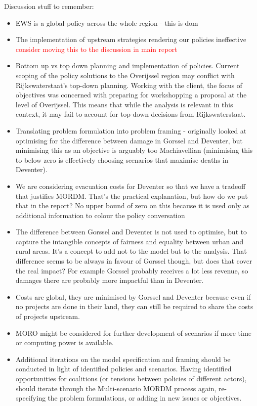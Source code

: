Discussion stuff to remember:
\begin{itemize}
    \item EWS is a global policy across the whole region - this is dom
    \item The implementation of upstream strategies rendering our policies ineffective \textcolor{red}{consider moving this to the discussion in main report}
    \item Bottom up vs top down planning and implementation of policies. Current scoping of the policy solutions to the Overijssel region may conflict with Rijkswaterstaat's top-down planning. Working with the client, the focus of objectives was concerned with preparing for workshopping a proposal at the level of Overijssel. This means that while the analysis is relevant in this context, it may fail to account for top-down decisions from Rijkswaterstaat.
    \item Translating problem formulation into problem framing - originally looked at optimising for the difference between damage in Gorssel and Deventer, but minimising this as an objective is arguably too Machiavellian (minimising this to below zero is effectively choosing scenarios that maximise deaths in Deventer).
    \item We are considering evacuation costs for Deventer so that we have a tradeoff that justifies MORDM. That's the practical explanation, but how do we put that in the report? No upper bound of zero on this because it is used only as additional information to colour the policy conversation
    \item The difference between Gorssel and Deventer is not used to optimise, but to capture the intangible concepts of fairness and equality between urban and rural areas. It's a concept to add not to the model but to the analysis. That difference seems to be always in favour of Gorssel though, but does that cover the real impact? For example Gorssel probably receives a lot less revenue, so damages there are probably more impactful than in Deventer.
    \item Costs are global, they are minimised by Gorssel and Deventer because even if no projects are done in their land, they can still be required to share the costs of projects upstream.
    \item MORO might be considered for further development of scenarios if more time or computing power is available.
    \item Additional iterations on the model specification and framing should be conducted in light of identified policies and scenarios. Having identified opportunities for coalitions (or tensions between policies of different actors), should iterate through the Multi-scenario MORDM process again, re-specifying the problem formulations, or adding in new issues or objectives.
\end{itemize}